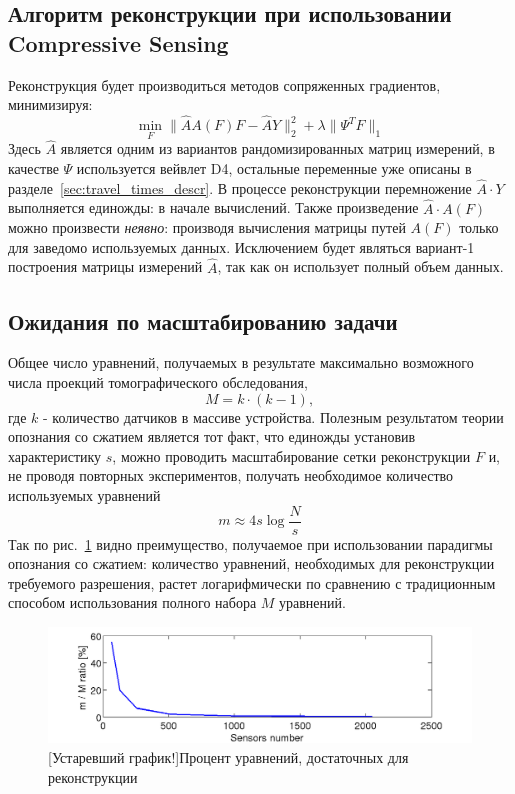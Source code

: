 \documentclass[14pt]{matmex-diploma}
\begin{document}
\subsection{Алгоритм реконструкции при использовании Compressive Sensing}
Реконструкция будет производиться методов сопряженных градиентов, минимизируя:
\begin{equation}
\label{eq:conj_cs}
\min_F \| \hat{A} A(F) F - \hat{A}Y \|_2^2 + \lambda \| \Psi^T F \|_1
\end{equation}
Здесь $\hat{A}$ является одним из вариантов рандомизированных матриц измерений, в качестве $\Psi$ используется вейвлет D4, остальные переменные уже описаны в разделе~\ref{sec:travel_times_descr}. В процессе реконструкции перемножение $\hat{A}\cdot Y$ выполняется единожды: в начале вычислений. Также произведение $\hat{A} \cdot A(F)$ можно произвести \textit{неявно}: производя вычисления матрицы путей $A(F)$ только для заведомо используемых данных. Исключением будет являться вариант-1 построения матрицы измерений $\hat{A}$, так как он использует полный объем данных.

\subsection{Ожидания по масштабированию задачи}
Общее число уравнений, получаемых в результате максимально возможного числа проекций томографического обследования, \[M = k\cdot (k-1),\] где $k$ - количество датчиков в массиве устройства. 
Полезным результатом теории опознания со сжатием является тот факт, что единожды установив характеристику $s$, можно проводить масштабирование сетки реконструкции $F$ и, не проводя повторных экспериментов, получать необходимое количество используемых уравнений
\begin{equation}\label{eq:approx_m}
m \approx 4 s  \log{\frac{N}{s}} 
\end{equation}
Так по рис.~\ref{fig:percents} видно преимущество, получаемое при использовании парадигмы опознания со сжатием: количество уравнений, необходимых для реконструкции требуемого разрешения, растет логарифмически по сравнению с традиционным способом использования полного набора $M$ уравнений.

\begin{figure}[h]
\centering
    \includegraphics[width=1\textwidth]{pics/percents.png}
    \caption{[Устаревший график!]Процент уравнений, достаточных для реконструкции}
    \label{fig:percents}
\end{figure}
\end{document}
